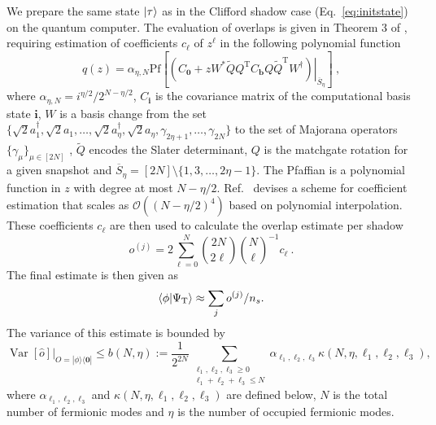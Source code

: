 \documentclass[../main.tex]{subfiles}
\begin{document}
We prepare the same state $\ket{\tau}$ as in the Clifford shadow case (Eq.~\ref{eq:initstate}) on the quantum computer. The evaluation of overlaps is given in Theorem 3 of \cite{wan2022matchgate}, requiring estimation of coefficients $c_\ell$ of $z^\ell$ in the following polynomial function
\begin{equation}
    \label{eq:matchgateinversechannel}
    q(z)=\alpha_{\eta, N}\text{Pf}\left[\left.\left(C_{\boldsymbol{0}}+zW^*\tilde Q Q^\text{T}C_{\textbf{b}}Q\tilde Q^\text{T}W^\dagger\right)\right|_{\overline{S}_{\eta}}\right]~,
\end{equation} where $\alpha_{\eta, N}=i^{\eta/2}/2^{N-\eta/2}$, $C_\textbf{i}$ is the covariance matrix of the computational basis state  $\textbf{i}$, $W$ is a basis change from the set $\{\sqrt{2}a_1^\dagger,\sqrt{2}a_1,\dots,\sqrt{2}a_\eta^\dagger,\sqrt{2}a_\eta,\gamma_{2\eta+1},\dots,\gamma_{2N}\}$ to the set of Majorana operators $\{\gamma_\mu\}_{\mu\in[2N]}$ \cite{wan2022matchgate}, $\tilde Q$ encodes the Slater determinant, $Q$ is the matchgate rotation for a given snapshot and ${\overline{S}_{\eta}}=[2N]\setminus \{1,3,\dots,2\eta-1\}$. 
The Pfaffian is a polynomial function in $z$ with degree at most $N-\eta/2$. Ref.~\cite{wan2022matchgate} devises a scheme for coefficient estimation that scales as $\mathcal{O}((N-\eta/2)^4)$ based on polynomial interpolation. These coefficients $c_\ell$ are then used to calculate the overlap estimate per shadow
\begin{equation}
    \label{eq:kianna_estimation}
    o^{(j)}=2\sum_{\ell=0}^N\binom{2N}{2\ell}\binom{N}{\ell}^{-1}c_\ell~.
\end{equation} The final estimate is then given as
\begin{equation}
    \braket{\phi}{\Psi_\mathrm{T}} \approx \sum_j o^{(j)} / n_s.
\end{equation}
The variance of this estimate is bounded by
\cite{wan2022matchgate}
\begin{equation}
\label{eq:kiannabound}
    \left.\operatorname{Var}[\hat{o}]\right|_{O=|\phi\rangle\langle\mathbf{0}|} \leq b(N, \eta):=\frac{1}{2^{2 N}} \sum_{\substack{\ell_1, \ell_2, \ell_3 \geq 0 \\ \ell_1+\ell_2+\ell_3 \leq N}} \alpha_{\ell_1, \ell_2, \ell_3} \kappa\left(N, \eta, \ell_1, \ell_2, \ell_3\right),
\end{equation}
where $\alpha_{\ell_1, \ell_2, \ell_3}$ and $\kappa\left(N, \eta, \ell_1, \ell_2, \ell_3\right)$ are defined below, $N$ is the total number of fermionic modes and $\eta$ is the number of occupied fermionic modes.
\end{document}
